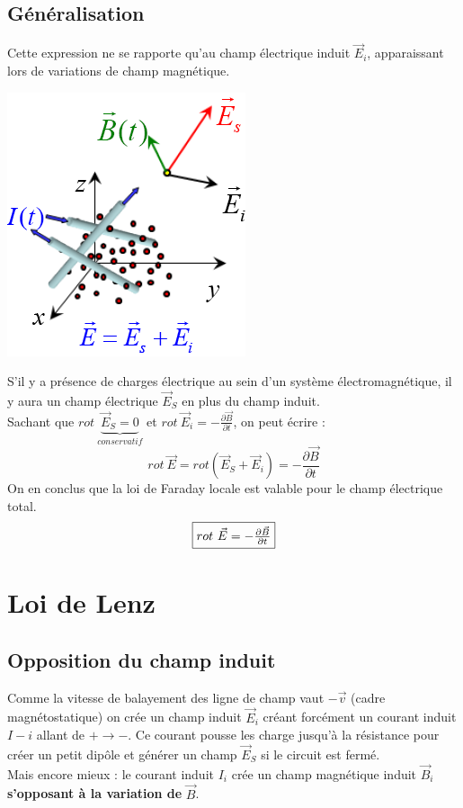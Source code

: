 \documentclass	[11pt, a4paper, openany]{book}
\begin{document}
\subsection{Généralisation}
Cette expression ne se rapporte qu'au champ électrique induit $\vec{E}_i$, apparaissant lors de variations de champ magnétique. 
\begin{center}
\includegraphics[scale=0.45]{em/image16.png}\\
\end{center}
S'il y a présence de charges électrique au sein d'un système électromagnétique, il y aura un champ électrique $\vec{E}_S$ en plus du champ induit.\\
Sachant que $rot\ \underbrace{\vec{E}_S = 0}_{conservatif}$ et $rot\ \vec{E}_i = -\frac{\partial \vec{B}}{\partial t}$, on peut écrire :
\begin{equation}
rot\ \vec{E} = rot(\vec{E}_S + \vec{E}_i) = -\frac{\partial \vec{B}}{\partial t}
\end{equation}
On en conclus que la loi de Faraday locale est valable pour le champ électrique total.
\begin{equation}
\fbox{$rot\ \vec{E} = -\frac{\partial \vec{B}}{\partial t}$}
\end{equation}

\section{Loi de Lenz}
\subsection{Opposition du champ induit}
Comme la vitesse de balayement des ligne de champ vaut $-\vec{v}$ (cadre magnétostatique) on crée un champ induit $\vec{E}_i$ créant forcément un courant induit $I-i$ allant de $+ \rightarrow -$. Ce courant pousse les charge jusqu'à la résistance pour créer un petit dipôle et générer un champ $\vec{E}_S$ si le circuit est fermé.\\
Mais encore mieux : le courant induit $I_i$ crée un champ magnétique induit $\vec{B}_i$ \textbf{s'opposant à la variation de }$\vec{B}$.
\end{document}
